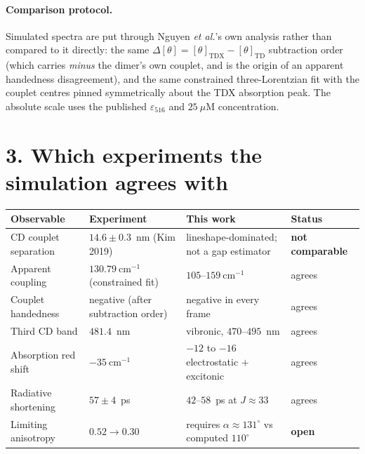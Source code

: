 \documentclass[11pt,a4paper]{article}
\begin{document}
\paragraph{Comparison protocol.} Simulated spectra are put through Nguyen
\emph{et al.}'s own analysis rather than compared to it directly: the same
$\Delta[\theta] = [\theta]_{\mathrm{TDX}} - [\theta]_{\mathrm{TD}}$ subtraction
order (which carries \emph{minus} the dimer's own couplet, and is the origin of
an apparent handedness disagreement), and the same constrained three-Lorentzian
fit with the couplet centres pinned symmetrically about the TDX absorption peak.
The absolute scale uses the published $\varepsilon_{516}$ and $25~\mu$M
concentration.

\section*{3. Which experiments the simulation agrees with}

\begin{table}[h]
\centering\small
\begin{tabular}{llll}
\toprule
Observable & Experiment & This work & Status \\
\midrule
CD couplet separation & $14.6 \pm 0.3$~nm (Kim 2019) & lineshape-dominated; not a gap estimator & \textbf{not comparable} \\
Apparent coupling & $130.79~\mathrm{cm^{-1}}$ (constrained fit) & $105$--$159~\mathrm{cm^{-1}}$ & agrees \\
Couplet handedness & negative (after subtraction order) & negative in every frame & agrees \\
Third CD band & $481.4$~nm & vibronic, $470$--$495$~nm & agrees \\
Absorption red shift & $-35~\mathrm{cm^{-1}}$ & $-12$ to $-16$ electrostatic $+$ excitonic & agrees \\
Radiative shortening & $57 \pm 4$~ps & $42$--$58$~ps at $J \approx 33$ & agrees \\
Limiting anisotropy & $0.52 \to 0.30$ & requires $\alpha \approx 131^\circ$ vs computed $110^\circ$ & \textbf{open} \\
\bottomrule
\end{tabular}
\end{table}
\end{document}

